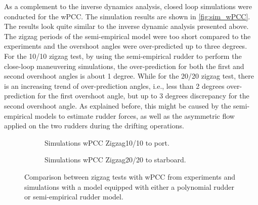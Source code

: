 \noindent As a complement to the inverse dynamics analysis, closed loop simulations were conducted for the wPCC. The simulation results are shown in \autoref{fig:sim_wPCC}. The results look quite similar to the inverse dynamic analysis presented above. The zigzag periods of the semi-empirical model were too short compared to the experiments and the overshoot angles were over-predicted up to three degrees. For the 10/10 zigzag test, by using the semi-empirical rudder to perform the close-loop maneuvering simulations, the over-prediction for both the first and second overshoot angles is about 1 degree. While for the 20/20 zigzag test, there is an increasing trend of over-prediction angles, i.e., less than 2 degrees over-prediction for the first overshoot angle, but up to 3 degrees discrepancy for the second overshoot angle. As explained before, this might be caused by the semi-empirical models to estimate rudder forces, as well as the asymmetric flow applied on the two rudders during the drifting operations.
\begin{figure}[h]
     \centering
     \begin{subfigure}[b]{\textwidth}
         \centering
         
        \caption{Simulations wPCC Zigzag10/10 to port.}
        \label{fig:sim_wPCC_10}
     \end{subfigure}
     \vfill
     \begin{subfigure}[b]{\textwidth}
        \centering
        
        \caption{Simulations wPCC Zigzag20/20 to starboard.}
        \label{fig:sim_wPCC_20}
     \end{subfigure}
        \caption{Comparison between zigzag tests with wPCC from experiments and simulations with a model equipped with either a polynomial rudder or semi-empirical rudder model.}
        \label{fig:sim_wPCC}
\end{figure}
%         
%         
%     
